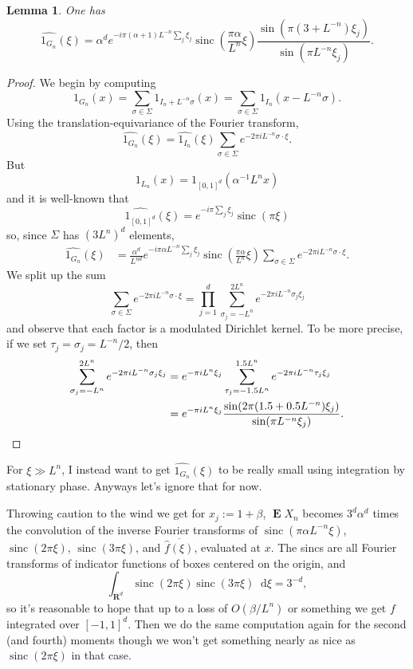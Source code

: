 \documentclass[reqno,10pt]{amsart}
\newcommand{\RR}{\mathbf{R}}
\DeclareMathOperator*{\Expect}{\mathbf E}
\newcommand*\dif{\mathop{}\!\mathrm{d}}
\DeclareMathOperator{\sinc}{sinc}
\newtheorem{lemma}[theorem]{Lemma}
\theoremstyle{definition}
\numberwithin{equation}{section}
\begin{document}
\begin{lemma}
One has
$$\widehat{1_{G_n}}(\xi) = \alpha^d e^{-i\pi(\alpha + 1)L^{-n} \sum_j \xi_j} \sinc\left(\frac{\pi \alpha}{L^n} \xi\right) \frac{\sin(\pi (3 + L^{-n}) \xi_j)}{\sin(\pi L^{-n} \xi_j)}.$$
\end{lemma}
\begin{proof}
We begin by computing 
$$1_{G_n}(x) = \sum_{\sigma \in \Sigma} 1_{I_n + L^{-n}\sigma}(x) = \sum_{\sigma \in \Sigma} 1_{I_n}(x - L^{-n}\sigma).$$
Using the translation-equivariance of the Fourier transform,
$$\widehat{1_{G_n}}(\xi) = \widehat{1_{I_n}}(\xi) \sum_{\sigma \in \Sigma} e^{-2\pi iL^{-n} \sigma \cdot \xi}.$$
But
$$1_{L_n}(x) = 1_{[0, 1]^d}(\alpha^{-1} L^n x)$$
and it is well-known that 
$$\widehat{1_{[0, 1]^d}}(\xi) = e^{-i\pi \sum_j \xi_j} \sinc(\pi \xi)$$
so, since $\Sigma$ has $(3L^n)^d$ elements,
\begin{align*}
\widehat{1_{G_n}}(\xi)
&=\frac{\alpha^d}{L^{nd}} e^{-i\pi \alpha L^{-n} \sum_j \xi_j} \sinc\left(\frac{\pi \alpha}{L^n} \xi\right) \sum_{\sigma \in \Sigma} e^{-2\pi iL^{-n} \sigma \cdot \xi}.
\end{align*}
We split up the sum 
$$\sum_{\sigma \in \Sigma} e^{-2\pi iL^{-n} \sigma \cdot \xi} = \prod_{j=1}^d \sum_{\sigma_j=-L^n}^{2L^n} e^{-2\pi iL^{-n} \sigma_j \xi_j}  $$
and observe that each factor is a modulated Dirichlet kernel.
To be more precise, if we set $\tau_j = \sigma_j = L^{-n}/2$, then 
\begin{align*}
\sum_{\sigma_j=-L^n}^{2L^n} e^{-2\pi iL^{-n} \sigma_j \xi_j}
&= e^{-\pi i L^n\xi_j} \sum_{\tau_j = -1.5 L^n}^{1.5 L^n} e^{-2\pi iL^{-n} \tau_j \xi_j} \\
&= e^{-\pi i L^n\xi_j} \frac{\sin(2\pi (1.5 + 0.5L^{-n}) \xi_j)}{\sin(\pi L^{-n} \xi_j)}. \qedhere
\end{align*}
\end{proof}

For $\xi \gg L^n$, I instead want to get $\widehat{1_{G_n}}(\xi)$ to be really small using integration by stationary phase. 
Anyways let's ignore that for now.

Throwing caution to the wind we get for $x_j := 1 + \beta$, $\Expect X_n$ becomes $3^d \alpha^d$ times the convolution of the inverse Fourier transforms of $\sinc(\pi \alpha L^{-n} \xi)$, $\sinc(2\pi \xi)$, $\sinc(3\pi \xi)$, and $\overline{\hat f(\xi)}$, evaluated at $x$.
The sincs are all Fourier transforms of indicator functions of boxes centered on the origin, and 
$$\int_{\RR^d} \sinc(2\pi \xi) \sinc(3\pi \xi) \dif \xi = 3^{-d},$$
so it's reasonable to hope that up to a loss of $O(\beta/L^n)$ or something we get $f$ integrated over $[-1, 1]^d$.
Then we do the same computation again for the second (and fourth) moments though we won't get something nearly as nice as $\sinc(2\pi \xi)$ in that case.

\printbibliography
\end{document}
